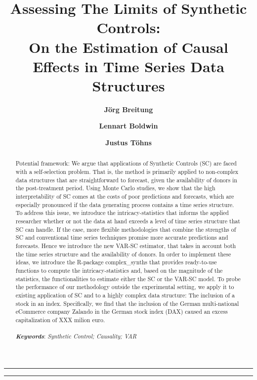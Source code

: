 \documentclass[11pt]{article}
\author[1]{\textbf{Jörg Breitung}}
\author[2]{\textbf{Lennart Boldwin}}
\author[3]{\textbf{Justus Töhns}}
\affil[1]{ University of Cologne, Chair of Statistics and Econometrics}
\affil[2,3]{ University of Cologne, Chair of Statistics and Econometrics \newline
	Supervised by Prof. Jörg Breitung
}
\title{\textbf{\huge Assessing The Limits of Synthetic Controls:}\\
	On the Estimation of Causal Effects in Time Series Data Structures}
\date{}
\begin{document}
	\onehalfspacing
	\pagestyle{headings}	
	\newpage
	\setcounter{page}{1}
	\renewcommand{\thepage}{\arabic{page}}
	
	
	
		
	\setlength{\parskip}{0.5em}
	
	\maketitle
	
	\noindent\rule{15cm}{0.5pt}
	\begin{abstract}
		Potential framework: We argue that applications of Synthetic Controls (SC) are faced with a self-selection problem. That is, the method is primarily applied to non-complex data structures that are straightforward to forecast, given the availability of donors in the post-treatment period. Using Monte Carlo studies, we show that the high interpretability of SC comes at the costs of poor predictions and forecasts, which are especially pronounced if the data generating process contains a time series structure. To address this issue, we introduce the intricacy-statistics that informs the applied researcher whether or not the data at hand exceeds a level of time series structure that SC can handle. If the case, more flexible methodologies that combine the strengths of SC and conventional time series techniques promise more accurate predictions and forecasts. Hence we introduce the new VAR-SC estimator, that takes in account both the time series structure and the availability of donors. In order to implement these ideas, we introduce the R-package complex\_synths that provides ready-to-use functions to compute the intricacy-statistics and, based on the magnitude of the statistics, the functionalities to estimate either the SC or the VAR-SC model. To probe the performance of our methodology outside the experimental setting, we apply it to existing application of SC and to a highly complex data structure: The inclusion of a stock in an index. Specifically, we find that the inclusion of the German multi-national eCommerce company Zalando in the German stock index (DAX) caused an excess capitalization of XXX milion euro.  \\ \\
		
		\textbf{\textit{Keywords}}: \textit{Synthetic Control; Causality; VAR}
	\end{abstract}
	\noindent\rule{15cm}{0.4pt}
	
	
	\newpage
	\doublespacing
	
	\newpage
	\tableofcontents
	\newpage
	
	\newpage	
	
	\newpage
	
	\newpage	
	
	\newpage
	
	\newpage
	
	

	\newpage
	 
	
	
\end{document}

